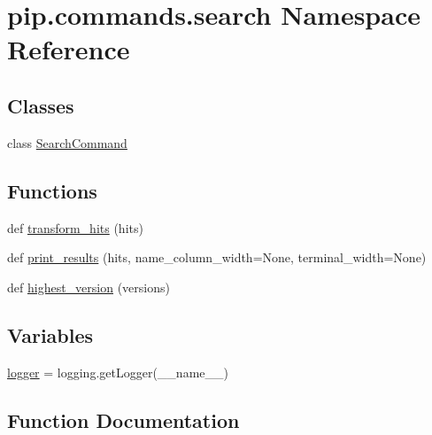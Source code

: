 \hypertarget{namespacepip_1_1commands_1_1search}{}\section{pip.\+commands.\+search Namespace Reference}
\label{namespacepip_1_1commands_1_1search}
\subsection*{Classes}
\begin{DoxyCompactItemize}
\item 
class \hyperlink{classpip_1_1commands_1_1search_1_1_search_command}{Search\+Command}
\end{DoxyCompactItemize}
\subsection*{Functions}
\begin{DoxyCompactItemize}
\item 
def \hyperlink{namespacepip_1_1commands_1_1search_aa00a19f6ffdaf3df3e019203b7ba31b1}{transform\+\_\+hits} (hits)
\item 
def \hyperlink{namespacepip_1_1commands_1_1search_aa47cac5590d7a1d7b284d2441e398b2b}{print\+\_\+results} (hits, name\+\_\+column\+\_\+width=None, terminal\+\_\+width=None)
\item 
def \hyperlink{namespacepip_1_1commands_1_1search_a000646176a9f643c081a2e371e60e3a4}{highest\+\_\+version} (versions)
\end{DoxyCompactItemize}
\subsection*{Variables}
\begin{DoxyCompactItemize}
\item 
\hyperlink{namespacepip_1_1commands_1_1search_ae76acd78f01d85ad3660494c3a9bda99}{logger} = logging.\+get\+Logger(\+\_\+\+\_\+name\+\_\+\+\_\+)
\end{DoxyCompactItemize}


\subsection{Function Documentation}
\mbox{\label{namespacepip_1_1commands_1_1search_a000646176a9f643c081a2e371e60e3a4}} 
